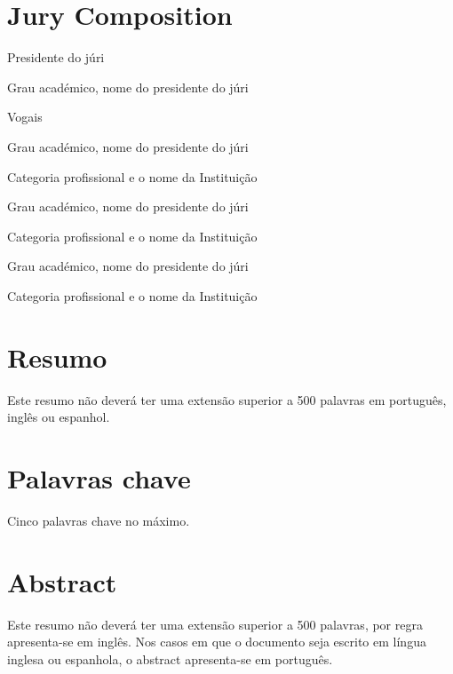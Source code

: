\documentclass[twoside, 11pt]{article}
\begin{document}
 
\blankpage
\newpage

\section*{Jury Composition}

\noindent Presidente do júri

Grau académico, nome do presidente do júri

\noindent Vogais

Grau académico, nome do presidente do júri

Categoria profissional e o nome da Instituição

\vspace{1cm}

Grau académico, nome do presidente do júri

Categoria profissional e o nome da Instituição

\vspace{1cm}

Grau académico, nome do presidente do júri

Categoria profissional e o nome da Instituição

\clearpage            %
\null                %
\newpage             %

\section*{Resumo}

Este resumo não deverá ter uma extensão superior a 500 palavras em  português, inglês ou espanhol.

\section*{Palavras chave}

Cinco palavras chave no máximo.

\clearpage            %
\null                %
\newpage             %

\section*{Abstract}

Este resumo não deverá ter uma extensão superior a 500 palavras, por regra apresenta-se em inglês. Nos casos em que o documento seja escrito em língua inglesa ou espanhola, o abstract apresenta-se em  português.
\end{document}
